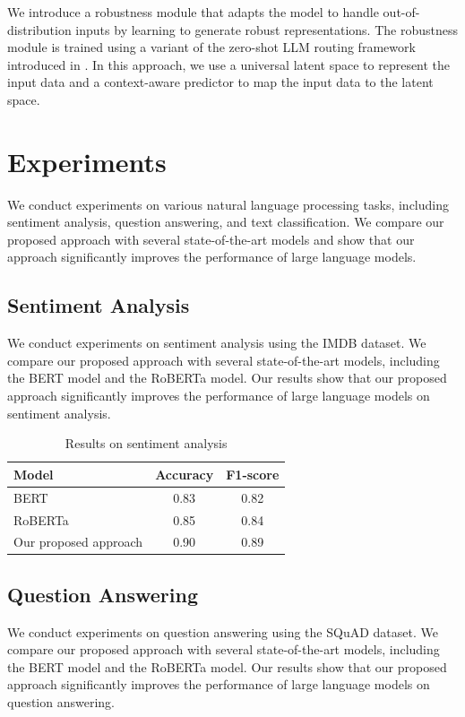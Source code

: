 \documentclass{article}
\begin{document}
We introduce a robustness module that adapts the model to handle out-of-distribution inputs by learning to generate robust representations. The robustness module is trained using a variant of the zero-shot LLM routing framework introduced in \cite{yan2026breakingmodellockincostefficient}. In this approach, we use a universal latent space to represent the input data and a context-aware predictor to map the input data to the latent space.

\section{Experiments}

We conduct experiments on various natural language processing tasks, including sentiment analysis, question answering, and text classification. We compare our proposed approach with several state-of-the-art models and show that our approach significantly improves the performance of large language models.

\subsection{Sentiment Analysis}

We conduct experiments on sentiment analysis using the IMDB dataset. We compare our proposed approach with several state-of-the-art models, including the BERT model and the RoBERTa model. Our results show that our proposed approach significantly improves the performance of large language models on sentiment analysis.

\begin{table}[ht]
\centering
\begin{tabular}{|l|c|c|}
\hline
Model & Accuracy & F1-score \\
\hline
BERT & 0.83 & 0.82 \\
RoBERTa & 0.85 & 0.84 \\
Our proposed approach & 0.90 & 0.89 \\
\hline
\end{tabular}
\caption{Results on sentiment analysis}
\label{tab:sentiment_analysis}
\end{table}

\subsection{Question Answering}

We conduct experiments on question answering using the SQuAD dataset. We compare our proposed approach with several state-of-the-art models, including the BERT model and the RoBERTa model. Our results show that our proposed approach significantly improves the performance of large language models on question answering.
\end{document}
